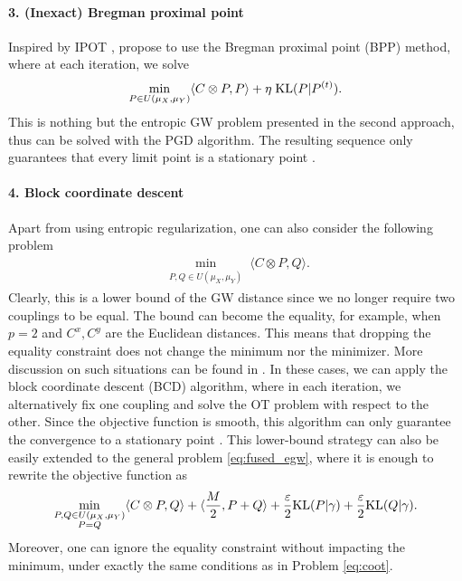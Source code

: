 \paragraph{3. (Inexact) Bregman proximal point} Inspired by IPOT \citep{Xie20}, \citep{Xu19, Xu19b}
propose to use the Bregman proximal point (BPP) method, where at each iteration, we solve
\begin{align}
  \min_{P \in U(\mu_X, \mu_Y)} \langle C \otimes P, P \rangle + \eta \; \text{KL}(P | P^{(t)}).
\end{align}
This is nothing but the entropic GW problem presented in the second approach, thus can be solved
with the PGD algorithm. The resulting sequence only guarantees that
every limit point is a stationary point \citep{Xu19}.

\paragraph{4. Block coordinate descent} Apart from using entropic regularization,
one can also consider the following problem
\begin{align}
  \label{eq:coot}
  \min_{\substack{P, Q \in U(\mu_X, \mu_Y)}} \langle C \otimes P, Q \rangle.
\end{align}
Clearly, this is a lower bound of the GW distance since we no longer require two couplings to be equal.
The bound can become the equality, for example, when $p=2$ and $C^x, C^y$ are the Euclidean distances.
This means that dropping the equality constraint does not change the minimum nor the minimizer.
More discussion on such situations can be found in .
In these cases, we can apply the block coordinate descent (BCD) algorithm,
where in each iteration, we alternatively fix one coupling and solve the OT problem
with respect to the other. Since the objective function is smooth,
this algorithm can only guarantee the convergence to a stationary point \citep{Tseng01}.
This lower-bound strategy can also be easily extended to the general problem \eqref{eq:fused_egw},
where it is enough to rewrite the objective function as
\begin{align}
  \min_{\substack{P, Q \in U(\mu_X, \mu_Y) \\ P = Q}} \langle C \otimes P, Q \rangle
  + \langle \frac{M}{2}, P + Q \rangle + \frac{\varepsilon}{2} \text{KL}(P | \gamma)
  + \frac{\varepsilon}{2} \text{KL}(Q | \gamma).
\end{align}
Moreover, one can ignore the equality constraint without impacting the minimum,
under exactly the same conditions as in Problem \eqref{eq:coot}.

